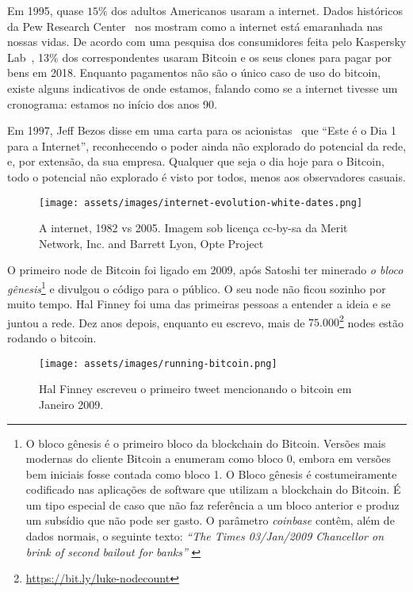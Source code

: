 Em 1995, quase $15\%$ dos adultos Americanos usaram a internet. 
Dados históricos da Pew Research Center~\cite{pew-research} nos mostram como a internet está 
emaranhada nas nossas vidas. De acordo com uma pesquisa dos consumidores feita pelo 
Kaspersky Lab~\cite{web:kaspersky}, 13\% dos correspondentes usaram Bitcoin e os seus clones para pagar por 
bens em 2018. Enquanto pagamentos não são o único caso de uso do bitcoin, existe alguns indicativos de onde 
estamos, falando como se a internet tivesse um cronograma: estamos no início dos anos 90.

Em 1997, Jeff Bezos disse em uma carta para os acionistas~\cite{bezos-letter} que
\enquote{Este é o Dia 1 para a Internet}, reconhecendo o poder ainda não explorado
do potencial da rede, e, por extensão, da sua empresa. Qualquer que seja o dia hoje para o Bitcoin, 
todo o potencial não explorado é visto por todos, menos aos observadores casuais. 

\begin{figure}
  \texttt{[image: assets/images/internet-evolution-white-dates.png]}
  \caption{A internet, 1982 vs 2005. Imagem sob licença cc-by-sa da Merit Network, Inc. and Barrett Lyon, Opte Project}
  \label{fig:internet-evolution-white-dates}
\end{figure}

O primeiro node de Bitcoin foi ligado em 2009, após Satoshi ter minerado 
\textit{o bloco gênesis}\footnote{O bloco gênesis é o primeiro bloco da blockchain do Bitcoin.
  Versões mais modernas do cliente Bitcoin a enumeram como bloco $0$, embora em versões bem iniciais
  fosse contada como bloco 1. O Bloco gênesis é costumeiramente codificado nas aplicações de software 
  que utilizam a blockchain do Bitcoin. É um tipo especial de caso que não faz referência a um bloco anterior 
  e produz um subsídio que não pode ser gasto. O parâmetro \textit{coinbase} contêm, além de dados normais, o seguinte texto:
  \textit{\enquote{The Times 03/Jan/2009 Chancellor on brink of second bailout for banks}} \cite{btcwiki:genesis-block}}
e divulgou o código para o público. O seu node não ficou sozinho por muito tempo. Hal Finney foi uma das primeiras pessoas
a entender a ideia e se juntou a rede. Dez anos depois, enquanto eu escrevo, mais de 
$75.000$\footnote{\url{https://bit.ly/luke-nodecount}} nodes estão rodando o bitcoin.

\begin{figure}
  \centering
  \texttt{[image: assets/images/running-bitcoin.png]}
  \caption{Hal Finney escreveu o primeiro tweet mencionando o bitcoin em Janeiro 2009.}
  \label{fig:running-bitcoin}
\end{figure}


